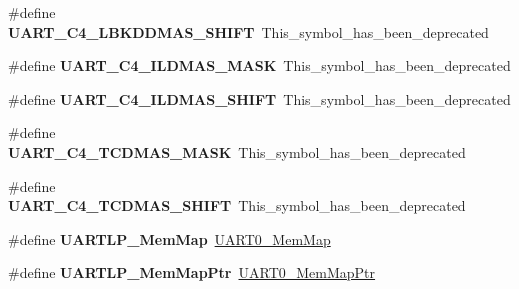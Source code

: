 \begin{DoxyCompactItemize}
\item 
\hypertarget{group___backward___compatibility___symbols_gaa3e4b00c90d731ac214ec241c5739824}{}\#define {\bfseries U\+A\+R\+T\+\_\+\+C4\+\_\+\+L\+B\+K\+D\+D\+M\+A\+S\+\_\+\+S\+H\+I\+F\+T}~This\+\_\+symbol\+\_\+has\+\_\+been\+\_\+deprecated\label{group___backward___compatibility___symbols_gaa3e4b00c90d731ac214ec241c5739824}

\item 
\hypertarget{group___backward___compatibility___symbols_ga12f2c283d457dabb4c399413da95290d}{}\#define {\bfseries U\+A\+R\+T\+\_\+\+C4\+\_\+\+I\+L\+D\+M\+A\+S\+\_\+\+M\+A\+S\+K}~This\+\_\+symbol\+\_\+has\+\_\+been\+\_\+deprecated\label{group___backward___compatibility___symbols_ga12f2c283d457dabb4c399413da95290d}

\item 
\hypertarget{group___backward___compatibility___symbols_ga696b99c80acb65a95530c792e61158a5}{}\#define {\bfseries U\+A\+R\+T\+\_\+\+C4\+\_\+\+I\+L\+D\+M\+A\+S\+\_\+\+S\+H\+I\+F\+T}~This\+\_\+symbol\+\_\+has\+\_\+been\+\_\+deprecated\label{group___backward___compatibility___symbols_ga696b99c80acb65a95530c792e61158a5}

\item 
\hypertarget{group___backward___compatibility___symbols_ga9a5b6a456c330e9d6b15e612c6e5725a}{}\#define {\bfseries U\+A\+R\+T\+\_\+\+C4\+\_\+\+T\+C\+D\+M\+A\+S\+\_\+\+M\+A\+S\+K}~This\+\_\+symbol\+\_\+has\+\_\+been\+\_\+deprecated\label{group___backward___compatibility___symbols_ga9a5b6a456c330e9d6b15e612c6e5725a}

\item 
\hypertarget{group___backward___compatibility___symbols_gad7b56c2826bb55b9112c190448d01176}{}\#define {\bfseries U\+A\+R\+T\+\_\+\+C4\+\_\+\+T\+C\+D\+M\+A\+S\+\_\+\+S\+H\+I\+F\+T}~This\+\_\+symbol\+\_\+has\+\_\+been\+\_\+deprecated\label{group___backward___compatibility___symbols_gad7b56c2826bb55b9112c190448d01176}

\item 
\hypertarget{group___backward___compatibility___symbols_ga92b653c99e40007d3c3339a79fa0e6a5}{}\#define {\bfseries U\+A\+R\+T\+L\+P\+\_\+\+Mem\+Map}~\hyperlink{struct_u_a_r_t0___mem_map}{U\+A\+R\+T0\+\_\+\+Mem\+Map}\label{group___backward___compatibility___symbols_ga92b653c99e40007d3c3339a79fa0e6a5}

\item 
\hypertarget{group___backward___compatibility___symbols_ga589ef759d83410b6f02bd68fcc3bf090}{}\#define {\bfseries U\+A\+R\+T\+L\+P\+\_\+\+Mem\+Map\+Ptr}~\hyperlink{group___u_a_r_t0___peripheral_gae795171499e041fb9b8f6ad5b97f896b}{U\+A\+R\+T0\+\_\+\+Mem\+Map\+Ptr}\label{group___backward___compatibility___symbols_ga589ef759d83410b6f02bd68fcc3bf090}


\end{DoxyCompactItemize}
